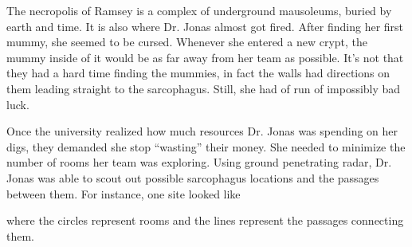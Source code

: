 The necropolis of Ramsey is a complex of underground mausoleums, buried by earth and time.
It is also where Dr. Jonas almost got fired.
After finding her first mummy, she seemed to be cursed.
Whenever she entered a new crypt, the mummy inside of it would be as far away from her team as possible.
It's not that they had a hard time finding the mummies, in fact the walls had directions on them leading straight to the sarcophagus.
Still, she had of run of impossibly bad luck.

Once the university realized how much resources Dr. Jonas was spending on her digs, they demanded she stop ``wasting'' their money.
She needed to minimize the number of rooms her team was exploring.
Using ground penetrating radar, Dr. Jonas was able to scout out possible sarcophagus locations and the passages between them.
For instance, one site looked like

\begin{center}
  \end{center}
  
where the circles represent rooms and the lines represent the passages connecting them.

